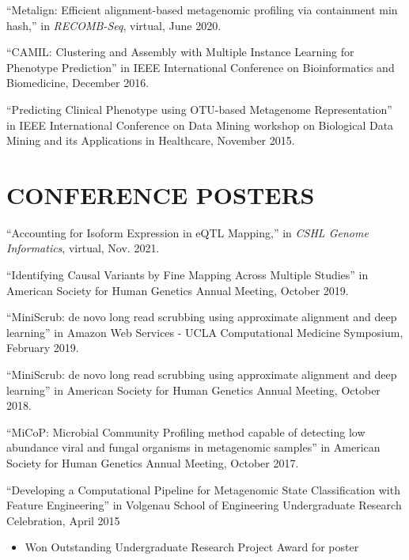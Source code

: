 \documentclass[margin, 10pt]{res} %
\begin{document}
\begin{resume}
``Metalign: Efficient alignment-based metagenomic profiling via containment min hash,'' in {\sl RECOMB-Seq}, virtual, June 2020.

``CAMIL: Clustering and Assembly with Multiple Instance Learning for Phenotype Prediction'' in IEEE International Conference on Bioinformatics and Biomedicine, December 2016.

``Predicting Clinical Phenotype using OTU-based Metagenome Representation'' in IEEE International Conference on Data Mining workshop on Biological Data Mining and its Applications in Healthcare, November 2015.


\section{CONFERENCE POSTERS}

``Accounting for Isoform Expression in eQTL Mapping,'' in {\sl CSHL Genome Informatics}, virtual, Nov. 2021.

``Identifying Causal Variants by Fine Mapping Across Multiple Studies'' in American Society for Human Genetics Annual Meeting, October 2019. 

``MiniScrub: de novo long read scrubbing using approximate alignment and deep learning'' in Amazon Web Services - UCLA Computational Medicine Symposium, February 2019.

``MiniScrub: de novo long read scrubbing using approximate alignment and deep learning'' in American Society for Human Genetics Annual Meeting, October 2018.

``MiCoP: Microbial Community Profiling method capable of detecting low abundance viral and fungal organisms in metagenomic samples'' in American Society for Human Genetics Annual Meeting, October 2017.

``Developing a Computational Pipeline for Metagenomic State Classification with Feature Engineering'' in Volgenau School of Engineering Undergraduate Research Celebration, April 2015
\begin{itemize} \itemsep -2pt %
\item Won Outstanding Undergraduate Research Project Award for poster
\end{itemize}





\end{resume}
\end{document}
